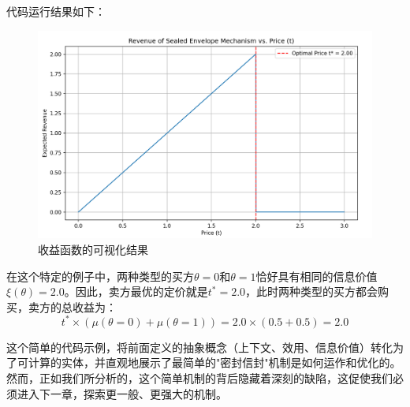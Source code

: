代码运行结果如下：
\begin{figure}[H]
    \centering
    \includegraphics[width=0.5\linewidth]{image14.png}
    \caption{收益函数的可视化结果}
    \label{fig:visualization}
\end{figure}

在这个特定的例子中，两种类型的买方$\theta=0$和$\theta=1$恰好具有相同的信息价值$\xi(\theta)=2.0$。因此，卖方最优的定价就是$t^*=2.0$，此时两种类型的买方都会购买，卖方的总收益为：
$$t^* \times (\mu(\theta=0) + \mu(\theta=1)) = 2.0 \times (0.5 + 0.5) = 2.0$$

这个简单的代码示例，将前面定义的抽象概念（上下文、效用、信息价值）转化为了可计算的实体，并直观地展示了最简单的"密封信封"机制是如何运作和优化的。然而，正如我们所分析的，这个简单机制的背后隐藏着深刻的缺陷，这促使我们必须进入下一章，探索更一般、更强大的机制。